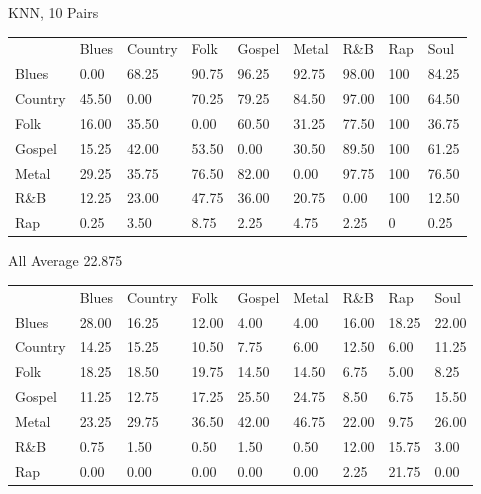 \documentclass[a4paper,oneside]{article}
\begin{document}
KNN, 10
Pairs
\begin{table}
\begin{tabular}{|l||*{8}{l|}} \hline
 & Blues & Country & Folk & Gospel & Metal & R\&B & Rap & Soul \\ \hhline{|=||*{8}{=|}}
Blues & 0.00 & 68.25 & 90.75 & 96.25 & 92.75 & 98.00 & 100 & 84.25 \\ \hline
Country & 45.50 & 0.00 & 70.25 & 79.25 & 84.50 & 97.00 & 100 & 64.50 \\ \hline
Folk & 16.00 & 35.50 & 0.00 & 60.50 & 31.25 & 77.50 & 100 & 36.75 \\ \hline
Gospel & 15.25 & 42.00 & 53.50 & 0.00 & 30.50 & 89.50 & 100 & 61.25 \\ \hline
Metal & 29.25 & 35.75 & 76.50 & 82.00 & 0.00 & 97.75 & 100 & 76.50 \\ \hline
R\&B & 12.25 & 23.00 & 47.75 & 36.00 & 20.75 & 0.00 & 100 & 12.50 \\ \hline
Rap & 0.25 & 3.50 & 8.75 & 2.25 & 4.75 & 2.25 & 0 & 0.25 \\ \hline
\end{tabular}
\end{table}

All
Average 22.875
\begin{table}
\begin{tabular}{|l||*{8}{l|}} \hline
 & Blues & Country & Folk & Gospel & Metal & R\&B & Rap & Soul \\ \hhline{|=||*{8}{=|}}
Blues & 28.00 & 16.25 & 12.00 & 4.00 & 4.00 & 16.00 & 18.25 & 22.00 \\ \hline
Country & 14.25 & 15.25 & 10.50 & 7.75 & 6.00 & 12.50 & 6.00 & 11.25 \\ \hline
Folk & 18.25 & 18.50 & 19.75 & 14.50 & 14.50 & 6.75 & 5.00 & 8.25 \\ \hline
Gospel & 11.25 & 12.75 & 17.25 & 25.50 & 24.75 & 8.50 & 6.75 & 15.50 \\ \hline
Metal & 23.25 & 29.75 & 36.50 & 42.00 & 46.75 & 22.00 & 9.75 & 26.00 \\ \hline
R\&B & 0.75 & 1.50 & 0.50 & 1.50 & 0.50 & 12.00 & 15.75 & 3.00 \\ \hline
Rap & 0.00 & 0.00 & 0.00 & 0.00 & 0.00 & 2.25 & 21.75 & 0.00 \\ \hline
\end{tabular}
\end{table}
\end{document}

